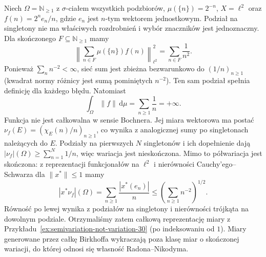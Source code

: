 \begin{przyklad}
\label{ex:birkhoff-infinite-variation-30}
Niech $\Omega=\mathbb N_{\ge1}$ z $\sigma$-ciałem
wszystkich podzbiorów, $\mu(\{n\})=2^{-n}$,
$X=\ell^2$ oraz $f(n)=2^n e_n/n$, gdzie $e_n$
jest $n$-tym wektorem jednostkowym.
Podział na singletony nie ma właściwych rozdrobnień
i wybór znaczników jest jednoznaczny.
Dla skończonego $F\subseteq\mathbb N_{\ge1}$ mamy
\[
 \left\|\sum_{n\in F}\mu(\{n\})f(n)\right\|_{\ell^2}^2
 =\sum_{n\in F}\frac1{n^2}.
\]
Ponieważ $\sum_n n^{-2}<\infty$, sieć sum jest
zbieżna bezwarunkowo do $(1/n)_{n\ge1}$ (kwadrat
normy różnicy jest sumą pominiętych $n^{-2}$).
Ten sam podział spełnia definicję dla każdego błędu.
Natomiast
\[
 \int_\Omega\|f\|\,\mathrm d\mu=\sum_{n\ge1}\frac1n
 =+\infty.
\]
Funkcja nie jest całkowalna w sensie Bochnera.
Jej miara wektorowa ma postać
$\nu_f(E)=(\chi_E(n)/n)_{n\ge1}$, co wynika
z analogicznej sumy po singletonach należących do $E$.
Podziały na pierwszych $N$ singletonów i ich dopełnienie
dają $|\nu_f|(\Omega)\ge\sum_{n=1}^N1/n$, więc wariacja
jest nieskończona. Mimo to półwariacja jest skończona:
z reprezentacji funkcjonałów na $\ell^2$ i nierówności
Cauchy'ego--Schwarza dla $\|x^*\|\le1$ mamy
\[
 |x^*\nu_f|(\Omega)=\sum_{n\ge1}\frac{|x^*(e_n)|}{n}
 \le\left(\sum_{n\ge1}n^{-2}\right)^{1/2}.
\]
Równość po lewej wynika z podziałów na singletony
i nierówności trójkąta na dowolnym podziale.
Otrzymaliśmy zatem całkową reprezentację miary
z Przykładu~\ref{ex:semivariation-not-variation-30}
(po indeksowaniu od $1$). Miary generowane przez
całkę Birkhoffa wykraczają poza klasę miar
o skończonej wariacji, do której odnosi się
własność Radona--Nikodyma.
\end{przyklad}

